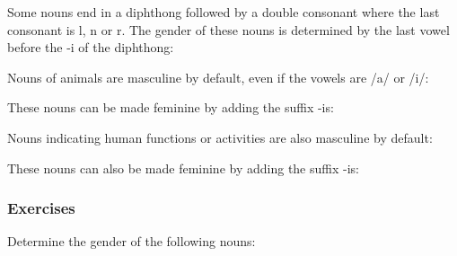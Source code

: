 Some nouns end in a diphthong followed by a double consonant where the last consonant is l, n or r. The gender of these nouns is determined by the last vowel before the -i of the diphthong:

Nouns of animals are masculine by default, even if the vowels are /a/ or /i/:

These nouns can be made feminine by adding the suffix -is:

Nouns indicating human functions or activities are also masculine by default:

These nouns can also be made feminine by adding the suffix -is:

\subsubsection{Exercises}

Determine the gender of the following nouns:

